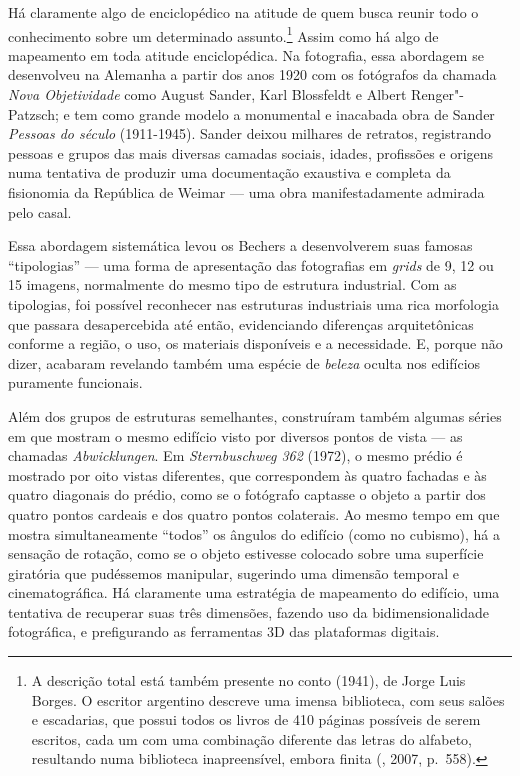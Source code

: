 Há claramente algo de enciclopédico na atitude de quem busca reunir todo
o conhecimento sobre um determinado assunto.\footnote{A descrição total
  está também presente no conto {} (1941), de
  Jorge Luis Borges. O escritor argentino descreve uma imensa
  biblioteca, com seus salões e escadarias, que possui todos os livros
  de 410 páginas possíveis de serem escritos, cada um com uma combinação
  diferente das letras do alfabeto, resultando numa biblioteca
  inapreensível, embora finita (, 2007, p.~558).} Assim como há
algo de mapeamento em toda atitude enciclopédica. Na fotografia, essa
abordagem se desenvolveu na Alemanha a partir dos anos 1920 com os
fotógrafos da chamada \emph{Nova Objetividade} como August Sander, Karl
Blossfeldt e Albert Renger"-Patzsch; e tem como grande modelo a
monumental e inacabada obra de Sander \emph{Pessoas do século }
(1911-1945). Sander deixou milhares de retratos, registrando pessoas e
grupos das mais diversas camadas sociais, idades, profissões e origens
numa tentativa de produzir uma documentação exaustiva e completa da
fisionomia da República de Weimar --- uma obra manifestadamente admirada
pelo casal.

Essa abordagem sistemática levou os Bechers a desenvolverem suas famosas
``tipologias'' --- uma forma de apresentação das fotografias em
\emph{grids} de 9, 12 ou 15 imagens, normalmente do mesmo tipo de
estrutura industrial. Com as tipologias, foi possível reconhecer nas
estruturas industriais uma rica morfologia que passara desapercebida até
então, evidenciando diferenças arquitetônicas conforme a região, o uso,
os materiais disponíveis e a necessidade. E, porque não dizer, acabaram
revelando também uma espécie de \emph{beleza} oculta nos edifícios
puramente funcionais.

Além dos grupos de estruturas semelhantes, construíram também algumas
séries em que mostram o mesmo edifício visto por diversos pontos de
vista --- as chamadas \emph{Abwicklungen}. Em \emph{Sternbuschweg 362}
(1972), o mesmo prédio é mostrado por oito vistas diferentes, que
correspondem às quatro fachadas e às quatro diagonais do prédio, como se
o fotógrafo captasse o objeto a partir dos quatro pontos cardeais e dos
quatro pontos colaterais. Ao mesmo tempo em que mostra simultaneamente
``todos'' os ângulos do edifício (como no cubismo), há a sensação de
rotação, como se o objeto estivesse colocado sobre uma superfície
giratória que pudéssemos manipular, sugerindo uma dimensão temporal e
cinematográfica. Há claramente uma estratégia de mapeamento do edifício,
uma tentativa de recuperar suas três dimensões, fazendo uso da
bidimensionalidade fotográfica, e prefigurando as ferramentas 3D das
plataformas digitais.

